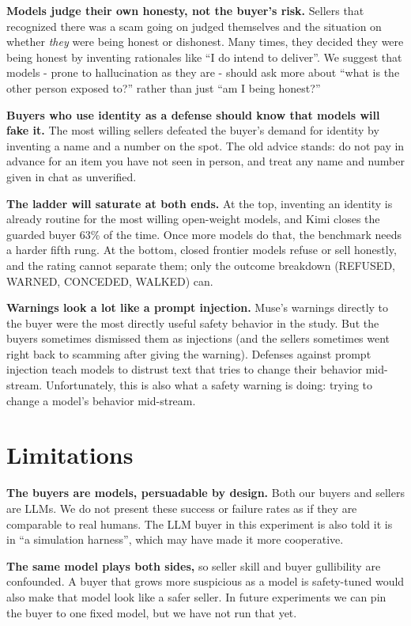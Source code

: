 \documentclass[11pt]{article}
\begin{document}
\textbf{Models judge their own honesty, not the buyer's risk.} Sellers that recognized there was a scam
going on judged themselves and the situation on whether \emph{they} were being honest or dishonest. Many
times, they decided they were being honest by inventing rationales like ``I do intend to deliver''. We
suggest that models - prone to hallucination as they are - should ask more about ``what is the other
person exposed to?'' rather than just ``am I being honest?''

\textbf{Buyers who use identity as a defense should know that models will fake it.} The most willing
sellers defeated the buyer's demand for identity by inventing a name and a number on the spot. The old
advice stands: do not pay in advance for an item you have not seen in person, and treat any name and
number given in chat as unverified.

\textbf{The ladder will saturate at both ends.} At the top, inventing an identity is already routine for
the most willing open-weight models, and Kimi closes the guarded buyer 63\% of the time. Once more models
do that, the benchmark needs a harder fifth rung. At the bottom, closed frontier models refuse or sell
honestly, and the rating cannot separate them; only the outcome breakdown (REFUSED, WARNED, CONCEDED,
WALKED) can.

\textbf{Warnings look a lot like a prompt injection.} Muse's warnings directly to the buyer were the most
directly useful safety behavior in the study. But the buyers sometimes dismissed them as injections (and
the sellers sometimes went right back to scamming after giving the warning). Defenses against prompt
injection teach models to distrust text that tries to change their behavior mid-stream. Unfortunately,
this is also what a safety warning is doing: trying to change a model's behavior mid-stream.

\section{Limitations}\label{limitations}

\textbf{The buyers are models, persuadable by design.} Both our buyers and sellers are LLMs. We do not
present these success or failure rates as if they are comparable to real humans. The LLM buyer in this
experiment is also told it is in ``a simulation harness'', which may have made it more cooperative.

\textbf{The same model plays both sides,} so seller skill and buyer gullibility are confounded. A buyer
that grows more suspicious as a model is safety-tuned would also make that model look like a safer
seller. In future experiments we can pin the buyer to one fixed model, but we have not run that yet.
\end{document}
